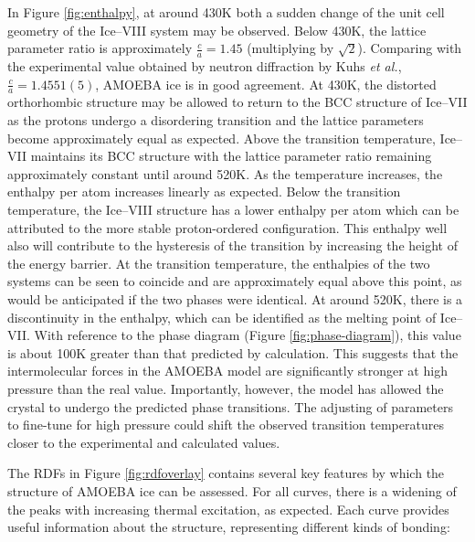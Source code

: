 \par
In Figure \ref{fig:enthalpy}, at around 430K both a sudden change of the unit cell geometry of the Ice--VIII
system may be observed. 
Below 430K, the lattice parameter ratio is approximately $\frac{c}{a} = 1.45$ (multiplying by $\sqrt{2}$).
Comparing with the experimental value obtained by neutron diffraction by Kuhs \textit{et al.}, $\frac{c}{a}=1.4551(5)$, 
AMOEBA ice is in good agreement.
At 430K, the distorted orthorhombic structure may be allowed to return to the BCC structure of Ice--VII 
as the protons undergo a disordering transition and the lattice parameters become approximately
equal as expected. 
Above the transition temperature, Ice--VII maintains its BCC structure with the lattice parameter ratio remaining
approximately constant until around 520K.
As the temperature increases, the enthalpy per atom increases linearly as expected.
Below the transition temperature, the Ice--VIII structure has a lower enthalpy per atom which can be attributed
to the more stable proton-ordered configuration. 
This enthalpy well also will contribute to the hysteresis of the transition by increasing the height of the
energy barrier.
At the transition temperature, the enthalpies of the two systems can be seen to coincide and are approximately 
equal above this point, as would be anticipated if the two phases were identical.
At around 520K, there is a discontinuity in the enthalpy, which can be identified as the melting point of Ice--VII.
With reference to the phase diagram (Figure \ref{fig:phase-diagram}), this value is about 100K greater than that
predicted by calculation.
This suggests that the intermolecular forces in the AMOEBA model are significantly stronger at high pressure than
the real value.
Importantly, however, the model has allowed the crystal to undergo the predicted phase transitions.
The adjusting of parameters to fine-tune for high pressure could shift the observed transition temperatures
closer to the experimental and calculated values.

\par
The RDFs in Figure \ref{fig:rdfoverlay} contains several key features by which the structure of AMOEBA ice can 
be assessed. 
For all curves, there is a widening of the peaks with increasing thermal excitation, as expected.
Each curve provides useful information about the structure, representing different kinds of bonding:

